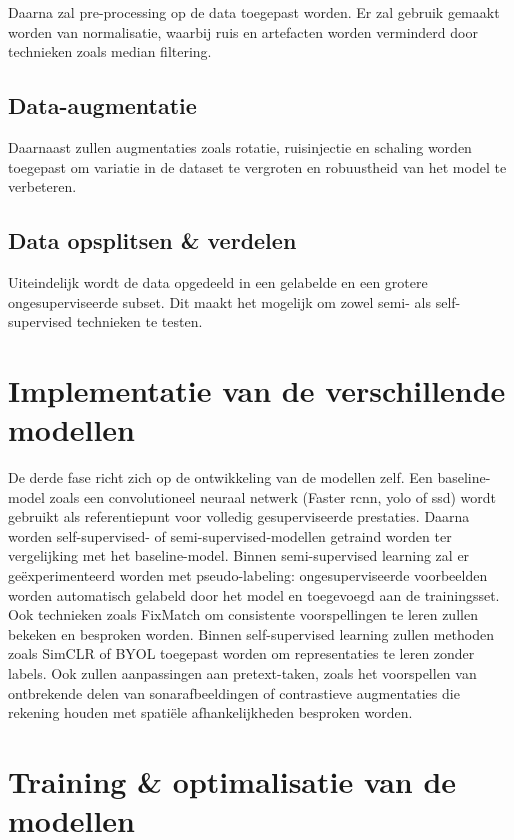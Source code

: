 Daarna zal pre-processing op de data toegepast worden. Er zal gebruik gemaakt worden van normalisatie, waarbij ruis en artefacten worden verminderd door technieken zoals median filtering.

\subsection{Data-augmentatie}

Daarnaast zullen augmentaties zoals rotatie, ruisinjectie en schaling worden toegepast om variatie in de dataset te vergroten en robuustheid van het model te verbeteren.

\subsection{Data opsplitsen \& verdelen}

Uiteindelijk wordt de data opgedeeld in een gelabelde en een grotere ongesuperviseerde subset. Dit maakt het mogelijk om zowel semi- als self-supervised technieken te testen.

\section{Implementatie van de verschillende modellen}

De derde fase richt zich op de ontwikkeling van de modellen zelf. Een baseline-model zoals een convolutioneel neuraal netwerk (Faster \gls{rcnn}, \gls{yolo} of \gls{ssd}) wordt gebruikt als referentiepunt voor volledig gesuperviseerde prestaties. Daarna worden self-supervised- of semi-supervised-modellen getraind worden ter vergelijking met het baseline-model. Binnen semi-supervised learning zal er geëxperimenteerd worden met pseudo-labeling: ongesuperviseerde voorbeelden worden automatisch gelabeld door het model en toegevoegd aan de trainingsset. Ook technieken zoals FixMatch om consistente voorspellingen te leren zullen bekeken en besproken worden. Binnen self-supervised learning zullen methoden zoals SimCLR of BYOL toegepast worden om representaties te leren zonder labels. Ook zullen aanpassingen aan pretext-taken, zoals het voorspellen van ontbrekende delen van sonarafbeeldingen of contrastieve augmentaties die rekening houden met spatiële afhankelijkheden besproken worden.

\section{Training \& optimalisatie van de modellen}

